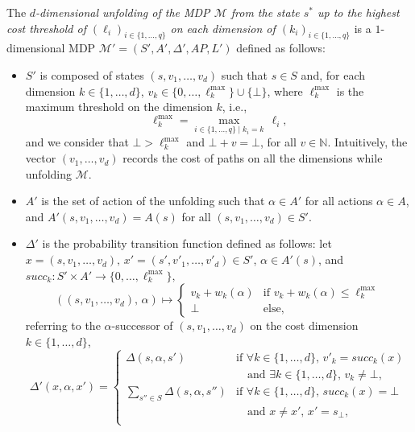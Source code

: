 \begin{definition}
The \textit{$d$-dimensional unfolding of the MDP $\mathcal{M}$ from the state $s^*$
up to the highest cost threshold of $(\ell_i)_{i \in \{1, \dots, q\}}$ on each dimension of $(k_i)_{i \in \{1, \dots, q\}}$} is a $1$-dimensional MDP \sloppy $\mathcal{M}' = {(S', A', \Delta', AP, L')}$ defined as follows:
  \begin{itemize}
    \item $S'$ is composed of states $(s, v_1, \dots, v_d)$ such that $s \in S$ and, for each dimension $k \in \{1, \dots, d\}$, $v_k \in \{0, \dots, \ell^{\max}_k\} \cup \{\bot\}$, where $\ell^{\max}_k$ is the maximum threshold on the dimension $k$, i.e., \[\ell^{\max}_k = \max_{i \in \{1, \dots, q\} \; | \; k_i = k }  \, \ell_i,\]
    and we consider that $\bot > \ell_k^{\max}$
    and $\bot + v = \bot$, for all $v \in \mathbb{N}$.
    Intuitively, the vector $(v_1, \dots, v_d)$ records the cost of paths on all the dimensions while unfolding $\mathcal{M}$.
    \item $A'$ is the set of action of the unfolding such that $\alpha \in A'$
    for all actions $\alpha \in A$, and
    $A'(s, v_1, \dots, v_d) = A(s)$
    for all $(s, v_1, \dots, v_d) \in S'$.
    \item $\Delta'$ is the probability transition function defined as follows: let $x = (s, v_1, \dots, v_d) , \, x'=(s', v'_1, \dots, v'_d) \in S'$, $\alpha \in A'(s)$,
    and
    $succ_k: S' \times A' \rightarrow \{0, \dots, \ell^{\max}_k\},$
    \[((s, v_1, \dots, v_d), \, \alpha) \mapsto \begin{cases}
      v_k + w_k(\alpha) & \text{if } v_k + w_k(\alpha) \leq \ell^{\max}_k \\
      \bot & \text{else},
    \end{cases}\]
    referring to the $\alpha$-successor of $(s, v_1, \dots, v_d)$ on the cost dimension $k \in \{1, \dots, d\}$,
    \[
    \Delta'(x, \alpha, x') = \begin{cases}
      \Delta(s, \alpha, s') & \text{if } \forall k \in \{1, \dots, d\}, \, v'_k = succ_k(x) \\
      & \quad \text{and }\exists k \in \{1, \dots, d\}, \, v_k \neq \bot, \\
      \sum_{s'' \in S} \Delta(s, \alpha, s'')
      & \text{if } \forall k \in \{1, \dots, d\},\, succ_k(x) = \bot \\
      & \quad \text{and } x \neq x', \, x' = s_\bot,\\

\end{cases}\]
\end{itemize}
\end{definition}
